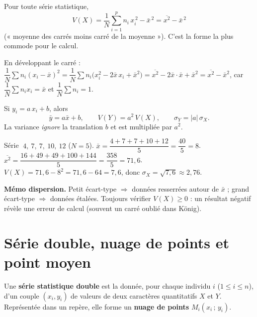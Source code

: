 \begin{theoreme}
Pour toute série statistique,
\[
\boxed{\,V(X)=\frac1N\sum_{i=1}^{p}n_i\,x_i^{\,2}-\bar x^{\,2}=\overline{x^2}-\bar x^{\,2}\,}
\]
(« moyenne des carrés moins carré de la moyenne »). C'est la forme la plus commode
pour le calcul.
\end{theoreme}

\begin{remarque}
En développant le carré :
$\dfrac1N\sum n_i(x_i-\bar x)^2=\dfrac1N\sum n_i\big(x_i^2-2\bar x\,x_i+\bar x^2\big)
=\overline{x^2}-2\bar x\cdot\bar x+\bar x^2=\overline{x^2}-\bar x^2$,
car $\dfrac1N\sum n_i x_i=\bar x$ et $\dfrac1N\sum n_i=1$.
\end{remarque}

\begin{propriete}
Si $y_i=a\,x_i+b$, alors
\[
\bar y=a\bar x+b,\qquad V(Y)=a^2\,V(X),\qquad \sigma_Y=|a|\,\sigma_X .
\]
La variance \emph{ignore} la translation $b$ et est multipliée par $a^2$.
\end{propriete}

\begin{exemple}
Série $\;4,\ 7,\ 7,\ 10,\ 12$ ($N=5$).
$\bar x=\dfrac{4+7+7+10+12}{5}=\dfrac{40}{5}=8$.
$\overline{x^2}=\dfrac{16+49+49+100+144}{5}=\dfrac{358}{5}=71{,}6$.
$V(X)=71{,}6-8^2=71{,}6-64=7{,}6$, donc $\sigma_X=\sqrt{7{,}6}\approx2{,}76$.
\end{exemple}

\begin{aretenir}
\textbf{Mémo dispersion.} Petit écart-type $\Rightarrow$ données resserrées autour
de $\bar x$ ; grand écart-type $\Rightarrow$ données étalées. Toujours vérifier
$V(X)\ge0$ : un résultat négatif révèle une erreur de calcul (souvent un carré
oublié dans König).
\end{aretenir}

\section{Série double, nuage de points et point moyen}

\begin{definition}
Une \textbf{série statistique double} est la donnée, pour chaque individu $i$ ($1\le i\le n$),
d'un couple $(x_i,y_i)$ de valeurs de deux caractères quantitatifs $X$ et $Y$. Représentée
dans un repère, elle forme un \textbf{nuage de points} $M_i(x_i\,;\,y_i)$.
\end{definition}

